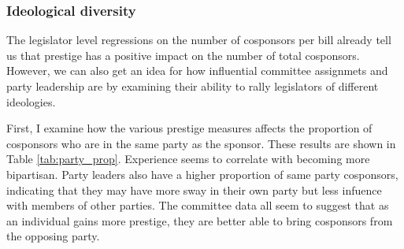 \documentclass{article}
\begin{document}
  \subsubsection{Ideological diversity}
  The legislator level regressions on the number of cosponsors per bill already tell us that prestige has a positive impact on the number of total cosponsors. However, we can also get an idea for how influential committee assignmets and party leadership are by examining their ability to rally legislators of different ideologies.
  
  First, I examine how the various prestige measures affects the proportion of cosponsors who are in the same party as the sponsor. These results are shown in Table \ref{tab:party_prop}. Experience seems to correlate with becoming more bipartisan. Party leaders also have a higher proportion of same party cosponsors, indicating that they may have more sway in their own party but less infuence with members of other parties. The committee data all seem to suggest that as an individual gains more prestige, they are better able to bring cosponsors from the opposing party. 
\end{document}
